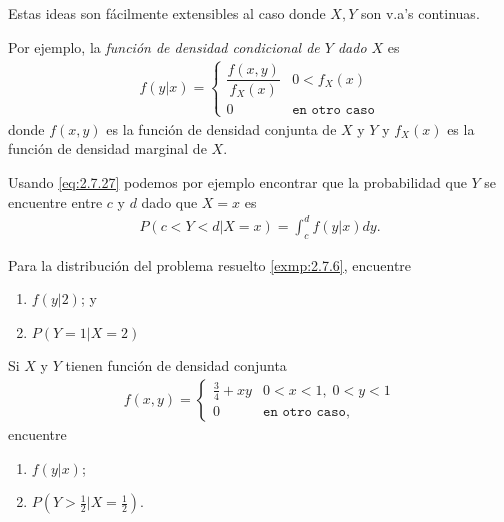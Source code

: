  Estas ideas son fácilmente extensibles al caso donde $X,Y$ son v.a's continuas.


 Por ejemplo, la \emph{función de densidad condicional de $Y$ dado $X$} es
 \begin{align}
  \label{eq:2.7.27}
  f(y|x)=
    \begin{cases}
   \dfrac{f(x,y)}{f_{X}(x)} & 0 < f_{X}(x)  \\
   0 & \texttt{en otro caso}
  \end{cases}
 \end{align}
 donde $f(x,y)$ es la función de densidad conjunta de $X$ y $Y$ y $f_{X}(x)$ es la función de densidad marginal de $X.$


 Usando \eqref{eq:2.7.27} podemos por ejemplo encontrar que la probabilidad que $Y$  se encuentre entre $c$ y $d$ dado que $X=x$ es
 \begin{align}
  \label{eq:2.7.28}P(c<Y<d|X=x)=
  \int_{c}^{d}f(y|x)dy.
 \end{align}




 \begin{ejemplo}
  \label{exmp:2.7.13}
  Para la distribución del problema resuelto \ref{exmp:2.7.6}, encuentre
  \begin{enumerate}
   \item $f(y|2)$; y
   \item $P(Y=1|X=2)$
  \end{enumerate}

 \end{ejemplo}



\begin{ejemplo}
 \label{exmp:2.7.14}
  Si $X$ y $Y$ tienen función de densidad conjunta
 \begin{align}
  f(x,y)=
  \begin{cases}
   \frac{3}{4}+xy & 0<x<1, \; 0<y<1 \\
   0 & \texttt{en otro caso},
  \end{cases}
 \end{align}
encuentre
\begin{enumerate}
 \item $f(y|x)$; 
 \item $P(Y>\frac{1}{2}| X = \frac{1}{2} )$.
\end{enumerate}

\end{ejemplo}



